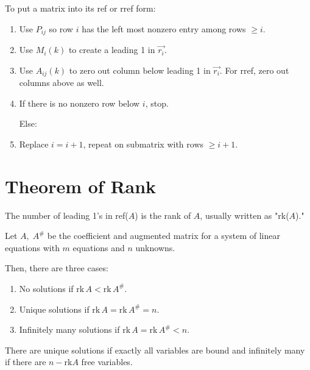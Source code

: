 \documentclass[../main.tex]{subfiles}
\begin{document}
To put a matrix into its ref or rref form:
\begin{enumerate}
    \item Use \( P_{ij} \) so row \( i \) has the left most nonzero entry among rows \( \geq i \).
    \item Use \( M_i(k) \) to create a leading 1 in \( \vec{r_i} \).
    \item Use \( A_{ij}(k) \) to zero out column below leading 1 in \( \vec{r_i} \).
    For rref, zero out columns above as well.
    \item If there is no nonzero row below \( i \), stop. 

    Else:
    \item Replace \( i=i+1 \), repeat on submatrix with rows \( \geq i+1 \).
\end{enumerate}


\section{Theorem of Rank}

\begin{definition}[Rank]
    The number of leading 1's in ref(\( A \)) is the rank of \( A \), usually written as "rk(\( A \))."
\end{definition}

\begin{theorem}
    Let \( A, \; A^\# \) be the coefficient and augmented matrix for a system of linear equations
    with \( m \) equations and \( n \) unknowns.

    Then, there are three cases:
    \begin{enumerate}
        \item No solutions if \( \text{rk} \, A < \text{rk} \, A^\# \).
        \item Unique solutions if \( \text{rk} \, A = \text{rk}\, A^\# = n \).
        \item Infinitely many solutions if \( \text{rk} \, A = \text{rk}\, A^\# < n \).
    \end{enumerate}
\end{theorem}
\begin{note}
    There are unique solutions if exactly all variables are bound and
    infinitely many if there are \( n - \text{rk} A \) free variables.
\end{note}
\end{document}
